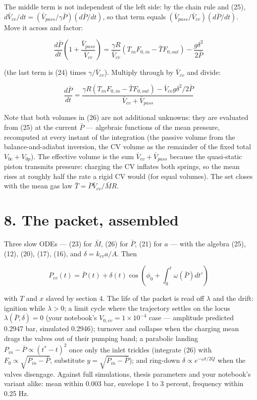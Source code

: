 \documentclass[11pt]{article}
\begin{document}
The middle term is not independent of the left side: by the chain rule and (25), $d\bar V_{cv}/dt = (\bar V_{pass}/\gamma\bar P)(d\bar P/dt)$, so that term equals $(\bar V_{pass}/\bar V_{cv})(d\bar P/dt)$. Move it across and factor:

\[
\frac{d\bar P}{dt}\left(1 + \frac{\bar V_{pass}}{\bar V_{cv}}\right) = \frac{\gamma R}{\bar V_{cv}}\left(T_{in}F_{0,in} - \bar TF_{0,out}\right) - \frac{g\delta^2}{2\bar P}
\]

(the last term is (24) times $\gamma/\bar V_{cv}$). Multiply through by $\bar V_{cv}$ and divide:

\begin{equation}
\frac{d\bar P}{dt} = \frac{\gamma R\left(T_{in}F_{0,in} - \bar TF_{0,out}\right) - \bar V_{cv}g\delta^2/2\bar P}{\bar V_{cv} + \bar V_{pass}} \tag{26}
\end{equation}

Note that both volumes in (26) are not additional unknowns: they are evaluated from (25) at the current $\bar P$ --- algebraic functions of the mean pressure, recomputed at every instant of the integration (the passive volume from the balance-and-adiabat inversion, the CV volume as the remainder of the fixed total $V_{0c} + V_{0p}$). The effective volume is the sum $\bar V_{cv} + \bar V_{pass}$ because the quasi-static piston transmits pressure: charging the CV inflates both springs, so the mean rises at roughly half the rate a rigid CV would (for equal volumes). The set closes with the mean gas law $\bar T = \bar P\bar V_{cv}/\bar MR$.

\section*{8. The packet, assembled}

Three slow ODEs --- (23) for $\bar M$, (26) for $\bar P$, (21) for $a$ --- with the algebra (25), (12), (20), (17), (16), and $\delta = k_{cv}a/A$. Then

\begin{equation}
P_{cv}(t) = \bar P(t) + \delta(t)\cos\left(\phi_0 + \int_0^t\omega(\bar P)dt'\right) \tag{27}
\end{equation}

with $T$ and $x$ slaved by section 4. The life of the packet is read off $\lambda$ and the drift: ignition while $\lambda > 0$; a limit cycle where the trajectory settles on the locus $\lambda(\bar P, \delta) = 0$ (your notebook's $V_{0,cv} = 1\times10^{-4}$ case --- amplitude predicted 0.2947 bar, simulated 0.2946); turnover and collapse when the charging mean drags the valves out of their pumping band; a parabolic landing $P_{in} - \bar P \propto (t^\ast - t)^2$ once only the inlet trickles (integrate (26) with $F_0 \propto \sqrt{P_{in}-\bar P}$, substitute $y = \sqrt{P_{in}-\bar P}$); and ring-down $\delta \propto e^{-\omega t/2Q}$ when the valves disengage. Against full simulations, thesis parameters and your notebook's variant alike: mean within 0.003 bar, envelope 1 to 3 percent, frequency within 0.25 Hz.
\end{document}
